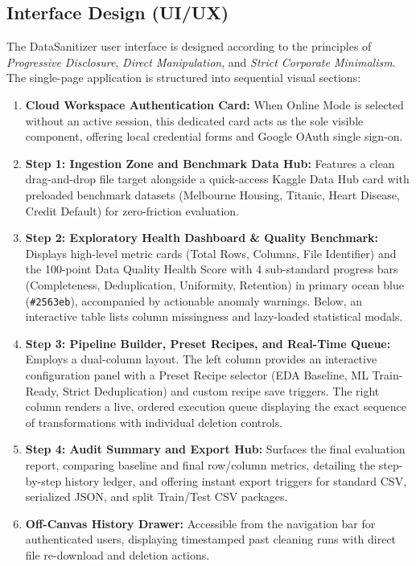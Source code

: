 \subsection{Interface Design (UI/UX)}
The DataSanitizer user interface is designed according to the principles of \emph{Progressive Disclosure}, \emph{Direct Manipulation}, and \emph{Strict Corporate Minimalism}. The single-page application is structured into sequential visual sections:
\begin{enumerate}
  \item \textbf{Cloud Workspace Authentication Card:} When Online Mode is selected without an active session, this dedicated card acts as the sole visible component, offering local credential forms and Google OAuth single sign-on.
  \item \textbf{Step 1: Ingestion Zone and Benchmark Data Hub:} Features a clean drag-and-drop file target alongside a quick-access Kaggle Data Hub card with preloaded benchmark datasets (Melbourne Housing, Titanic, Heart Disease, Credit Default) for zero-friction evaluation.
  \item \textbf{Step 2: Exploratory Health Dashboard \& Quality Benchmark:} Displays high-level metric cards (Total Rows, Columns, File Identifier) and the 100-point Data Quality Health Score with 4 sub-standard progress bars (Completeness, Deduplication, Uniformity, Retention) in primary ocean blue (\texttt{\#2563eb}), accompanied by actionable anomaly warnings. Below, an interactive table lists column missingness and lazy-loaded statistical modals.
  \item \textbf{Step 3: Pipeline Builder, Preset Recipes, and Real-Time Queue:} Employs a dual-column layout. The left column provides an interactive configuration panel with a Preset Recipe selector (EDA Baseline, ML Train-Ready, Strict Deduplication) and custom recipe save triggers. The right column renders a live, ordered execution queue displaying the exact sequence of transformations with individual deletion controls.
  \item \textbf{Step 4: Audit Summary and Export Hub:} Surfaces the final evaluation report, comparing baseline and final row/column metrics, detailing the step-by-step history ledger, and offering instant export triggers for standard CSV, serialized JSON, and split Train/Test CSV packages.
  \item \textbf{Off-Canvas History Drawer:} Accessible from the navigation bar for authenticated users, displaying timestamped past cleaning runs with direct file re-download and deletion actions.
\end{enumerate}

